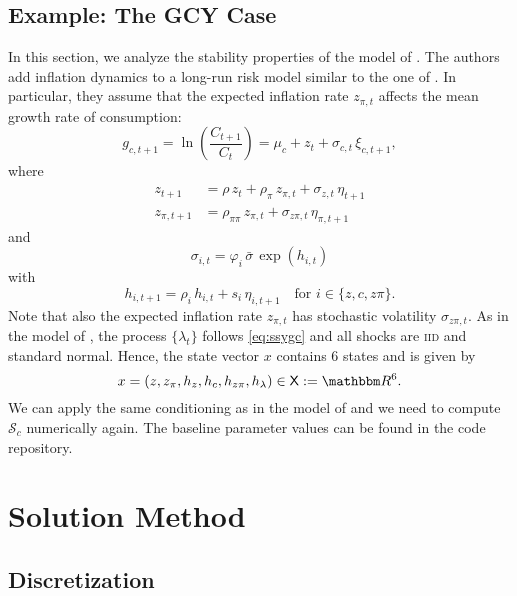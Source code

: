 \documentclass[12pt, reqno]{amsart}
\newcommand{\1}{\mathbbm 1}
\newcommand{\sS}{\mathcal S}
\newcommand{\RR}{\mathbbm R}
\newcommand{\XX}{\mathsf X}
\renewcommand{\phi}{\varphi}
\theoremstyle{plain}
\theoremstyle{definition}
\begin{document}
\subsection{Example: The GCY Case}

In this section, we analyze the stability properties of the model of
\cite{GomezYaron2020}. The authors add inflation dynamics to a long-run risk
model similar to the one of \cite{schorfheide2018identifying}. In particular,
they assume that the expected inflation rate $z_{\pi,t}$ affects the mean growth
rate of consumption:
%
\begin{equation}\label{eq:gcycg}
	g_{c, t+1} 
	= \ln \left( \frac{C_{t+1}}{C_t} \right)    
	= \mu_c + z_t + \sigma_{c, t} \, \xi_{c, t+1},
\end{equation}
%
where
%
\begin{align*}
	z_{t+1} 
	&= \rho \, z_t + \rho_{\pi} \, z_{\pi,t}+ 
	\sigma_{z, t} \, \eta_{t+1}\\
	z_{\pi,t+1} 
	&= \rho_{\pi \pi} \, z_{\pi,t} + \sigma_{z \pi, t} \, \eta_{\pi,t+1}
\end{align*}
%
and
%
\begin{equation}
	\sigma_{i,t} 
	= \phi_i \, \bar{\sigma} \, \exp(h_{i, t})
\end{equation}
%
with
%
\begin{equation*}
	h_{i, t+1}
	= \rho_i \, h_{i,t} + s_i \, \eta_{i, t+1}
	\quad \text{for } i \in \{z, c, z\pi \}.
\end{equation*}
%
Note that also the expected inflation rate $z_{\pi,t}$ has stochastic volatility
$\sigma_{z\pi,t}$. As in the model of \cite{schorfheide2018identifying}, the
process $\{\lambda_t\}$ follows \eqref{eq:ssygc} and all shocks are
\textsc{iid} and standard normal. Hence, the state vector $x$ contains 6 states
and is given by
%
\begin{equation*}
    x = (z, z_\pi, h_z, h_c, h_{z\pi}, h_\lambda) \in \XX := \RR^6. 
\end{equation*}
%
We can apply the same conditioning as in the model of
\cite{schorfheide2018identifying} and we need to compute $\sS_c$ numerically
again. The baseline parameter values can be found in the code repository.



\section{Solution Method}


\subsection{Discretization}
\end{document}
